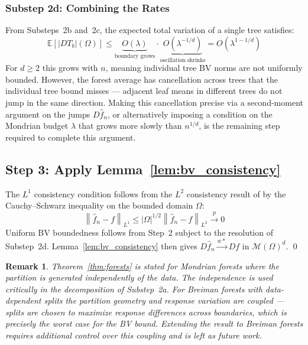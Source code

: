 \documentclass[12pt]{article}
\newtheorem{remark}{Remark}
\newcommand{\norm}[1]{\left\| #1 \right\|}
\newcommand{\E}{\mathbb{E}}
\newcommand{\cM}{\mathcal{M}(\Omega)^d}
\newcommand{\fn}{\hat{f}_n}
\newcommand{\xrightarrowp}{\xrightarrow{p}}
\begin{document}
	\subsubsection*{Substep 2d: Combining the Rates}
	
	From Substeps~2b and~2c, the expected total variation of a single tree
	satisfies:
	\begin{equation}
		\E\!\left[|DT_b|(\Omega)\right]
		\leq \underbrace{O(\lambda)}_{\text{boundary grows}} \cdot
		\underbrace{O(\lambda^{-1/d})}_{\text{oscillation shrinks}}
		= O\!\left(\lambda^{1 - 1/d}\right)
	\end{equation}
	For $d \geq 2$ this grows with $n$, meaning individual tree BV norms are not
	uniformly bounded. However, the forest average has cancellation across trees
	that the individual tree bound misses --- adjacent leaf means in different
	trees do not jump in the same direction. Making this cancellation precise
	via a second-moment argument on the jumps $D\fn$, or alternatively imposing
	a condition on the Mondrian budget $\lambda$ that grows more slowly than
	$n^{1/d}$, is the remaining step required to complete this argument.
	
	\subsection{Step 3: Apply Lemma~\ref{lem:bv_consistency}}
	
	The $L^1$ consistency condition follows from the $L^2$ consistency result of
	\citet{scornet2015forests} by the Cauchy--Schwarz inequality on the bounded
	domain $\Omega$:
	\begin{equation}
		\norm{\fn - f}_{L^1}
		\leq |\Omega|^{1/2} \norm{\fn - f}_{L^2}
		\xrightarrowp 0
	\end{equation}
	Uniform BV boundedness follows from Step~2 subject to the resolution of
	Substep~2d. Lemma~\ref{lem:bv_consistency} then gives
	$D\fn \xrightarrow{w*} Df$ in $\cM$. \qed
	
	\begin{remark}
		Theorem~\ref{thm:forests} is stated for Mondrian forests where the partition
		is generated independently of the data. The independence is used critically in
		the decomposition of Substep~2a. For Breiman forests with data-dependent
		splits the partition geometry and response variation are coupled --- splits are
		chosen to maximize response differences across boundaries, which is precisely
		the worst case for the BV bound. Extending the result to Breiman forests
		requires additional control over this coupling and is left as future work.
	\end{remark}
	
	
	
\end{document}
